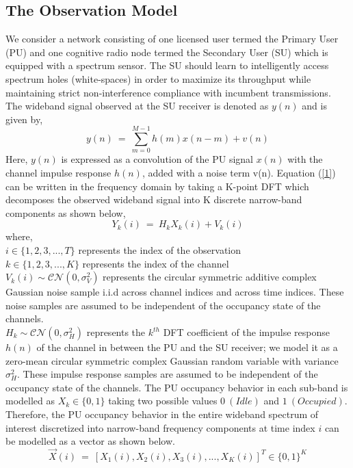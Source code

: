 \documentclass[12pt, draftcls, onecolumn]{IEEEtran}
\begin{document}
\subsection{The Observation Model}
We consider a network consisting of one licensed user termed the Primary User (PU) and one cognitive radio node termed the Secondary User (SU) which is equipped with a spectrum sensor. The SU should learn to intelligently access spectrum holes (white-spaces) in order to maximize its throughput while maintaining strict non-interference compliance with incumbent transmissions. The wideband signal observed at the SU receiver is denoted as $y(n)$ and is given by,
\begin{equation}\label{1}
    y(n)\ =\ \sum_{m=0}^{M-1} h(m)x(n-m) + v(n)
\end{equation}
Here, $y(n)$ is expressed as a convolution of the PU signal $x(n)$ with the channel impulse response $h(n)$, added with a noise term v(n).
Equation (\ref{1}) can be written in the frequency domain by taking a K-point DFT which decomposes the observed wideband signal into K discrete narrow-band components as shown below,
\begin{equation}\label{2}
    Y_k(i)\ =\ H_kX_k(i) + V_k(i)
\end{equation}
where,
\\$i \in \{1,2,3,...,T\}$ represents the index of the observation
\\$k \in \{1,2,3,...,K\}$ represents the index of the channel
\\$V_k(i) \sim \mathcal{CN}(0,\sigma_V^2)$ represents the circular symmetric additive complex Gaussian noise sample i.i.d across channel indices and across time indices. These noise samples are assumed to be independent of the occupancy state of the channels.
\\$H_k \sim \mathcal{CN}(0,\sigma_H^2)$ represents the $k^{th}$ DFT coefficient of the impulse response $h(n)$ of the channel in between the PU and the SU receiver; we model it as a zero-mean circular symmetric complex Gaussian random variable with variance $\sigma_H^2$. These impulse response samples are assumed to be independent of the occupancy state of the channels. The PU occupancy behavior in each sub-band is modelled as $X_k \in \{0,1\}$ taking two possible values $0\ (Idle)$ and $1\ (Occupied)$. Therefore, the PU occupancy behavior in the entire wideband spectrum of interest discretized into narrow-band frequency components at time index $i$ can be modelled as a vector as shown below.
\begin{equation}\label{3}
    \vec{X}(i)\ =\ [X_1(i),X_2(i),X_3(i),...,X_K(i)]^T \in \{0,1\}^K
\end{equation}
\end{document}
